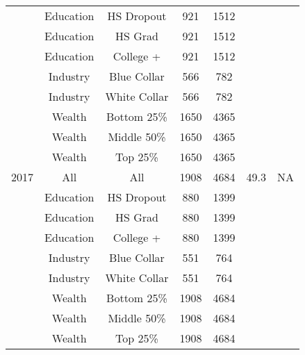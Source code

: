 \documentclass[12pt]{article}
\begin{document}
\begin{tabular}{||l|c|c|c|c|c|c||}
  & Education & HS Dropout & 921 & 1512 & & \\
  & Education & HS Grad & 921 & 1512 & & \\
  & Education & College + & 921 & 1512 & & \\
  & Industry & Blue Collar & 566 & 782 & & \\
  & Industry & White Collar & 566 & 782 & & \\
  & Wealth & Bottom 25\% & 1650 & 4365 & & \\
  & Wealth & Middle 50\% & 1650 & 4365 & & \\
  & Wealth & Top 25\% & 1650 & 4365 & & \\
  2017 & All & All & 1908 & 4684 & 49.3 & NA \\
  & Education & HS Dropout & 880 & 1399 & & \\
  & Education & HS Grad & 880 & 1399 & & \\
  & Education & College + & 880 & 1399 & & \\
  & Industry & Blue Collar & 551 & 764 & & \\
  & Industry & White Collar & 551 & 764 & & \\
  & Wealth & Bottom 25\% & 1908 & 4684 & & \\
  & Wealth & Middle 50\% & 1908 & 4684 & & \\
  & Wealth & Top 25\% & 1908 & 4684 & & \\
\end{tabular}
\end{document}
